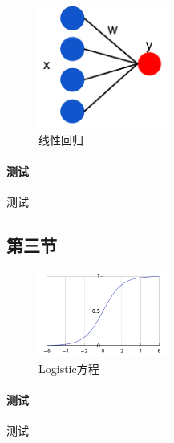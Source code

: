 \documentclass[a4paper, 11pt, hyperref, UTF8]{ctexart} %
\begin{document}

\begin{figure}[H]
\centering
\includegraphics[width=0.38\textwidth,height=0.38\textwidth]{1.png}
\caption{线性回归}
\end{figure}
\paragraph{测试}测试




\subsection{第三节}


\begin{figure}[H]
\centering
\includegraphics[width=0.38\textwidth,height=0.38\textwidth]{2.png}
\caption{Logistic方程}
\end{figure}

\paragraph{测试}测试
\end{document}

